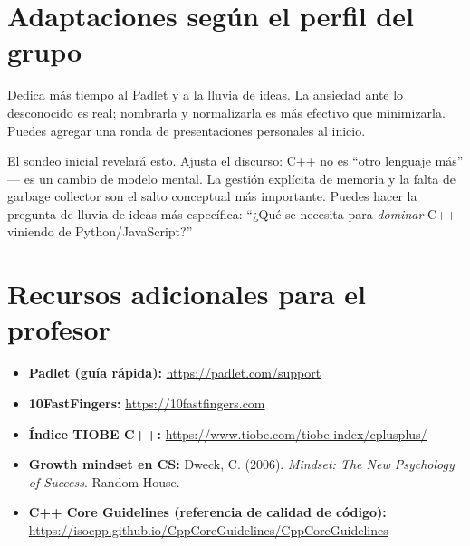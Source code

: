 \documentclass[12pt, oneside]{article}
\begin{document}
\section{Adaptaciones según el perfil del grupo}

\begin{notaprofesor}
  Dedica más tiempo al Padlet y a la lluvia de ideas. La ansiedad ante lo
  desconocido es real; nombrarla y normalizarla es más efectivo que minimizarla.
  Puedes agregar una ronda de presentaciones personales al inicio.
\end{notaprofesor}

\begin{notaprofesor}
  El sondeo inicial revelará esto. Ajusta el discurso: C++ no es ``otro
  lenguaje más'' — es un cambio de modelo mental. La gestión explícita de
  memoria y la falta de garbage collector son el salto conceptual más
  importante. Puedes hacer la pregunta de lluvia de ideas más específica:
  ``¿Qué se necesita para \textit{dominar} C++ viniendo de Python/JavaScript?''
\end{notaprofesor}

\section{Recursos adicionales para el profesor}

\begin{itemize}
  \item \textbf{Padlet (guía rápida):} \url{https://padlet.com/support}
  \item \textbf{10FastFingers:} \url{https://10fastfingers.com}
  \item \textbf{Índice TIOBE C++:} \url{https://www.tiobe.com/tiobe-index/cplusplus/}
  \item \textbf{Growth mindset en CS:} Dweck, C. (2006). \textit{Mindset: The New
        Psychology of Success}. Random House.
  \item \textbf{C++ Core Guidelines (referencia de calidad de código):}\\
        \url{https://isocpp.github.io/CppCoreGuidelines/CppCoreGuidelines}
\end{itemize}
\end{document}

